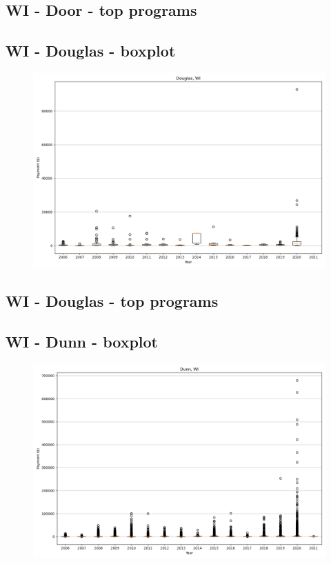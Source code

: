 \subsection*{WI - Door - top programs}

\newpage
\subsection*{WI - Douglas - boxplot}
\begin{figure}[h]
\centering
\includegraphics[width=7in]{../output/boxplots/counties/Douglas-WI_boxplot.png}
\end{figure}


\subsection*{WI - Douglas - top programs}

\newpage
\subsection*{WI - Dunn - boxplot}
\begin{figure}[h]
\centering
\includegraphics[width=7in]{../output/boxplots/counties/Dunn-WI_boxplot.png}
\end{figure}


